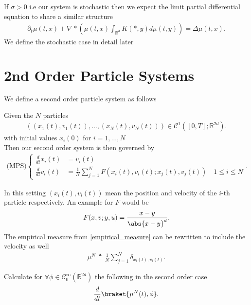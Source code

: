 \begin{corollary}
  If $\sigma  > 0$ i.e our system is stochastic then we expect the limit partial differential equation to share a similar structure
  \begin{align*}
    \partial_t \mu(t,x) + \nabla * \left( \mu(t,x) \int_{\mathbb{R}^{d} } K(*,y) d\mu(t,y) \right)  = \Delta \mu(t,x)
  .\end{align*}
  We define the stochastic case in detail later 
\end{corollary}
\section{2nd Order Particle Systems}
We define a second order particle system as follows 
\begin{definition}
 Given the $N$ particles 
 \begin{align*}
   ((x_{1}(t),v_{1}(t)),\ldots ,(x_N(t),v_N(t))) \in  \mathcal{C}^{1}([0,T];\mathbb{R}^{2d} ) 
 .\end{align*}
 with initial values  $x_i(0)$  for $i = 1,\ldots ,N$\\[1ex]
  Then our second order system is then governed by  
  \begin{align*}
    \text{(MPS)}\begin{cases}
      \frac{d}{dt} x_i(t) &= v_i(t) \\
      \frac{d}{dt} v_i(t) &= \frac{1}{N} \sum_{j=1}^{N} F(x_{i}(t),v_i(t) ; x_j(t),v_j(t) )  \quad 1\le i\le N
    \end{cases}
  .\end{align*}
\end{definition}
In this setting $(x_{i}(t),v_i(t))$ mean the position and velocity of the $i$-th particle respectively.
An example for $F$ would be 
\begin{align*}
  F(x,v;y,u) = \frac{x-y}{\abs{x-y}^{d} }
.\end{align*}
The empirical measure from \autoref{empirical_measure} can be rewritten to include the velocity as well 
\begin{align*}
  \mu^N \triangleq \frac{1}{N} \sum_{j=1}^{N} \delta_{x_i(t),v_i(t)} 
.\end{align*}
\begin{exercise}
 Calculate  for $\forall  \phi  \in  \mathcal{C}_0^{\infty}(\mathbb{R}^{2d} ) $  the following in  the second order case
 \begin{align*}
   \frac{d}{dt} \braket{\mu^N(t),\phi }
 .\end{align*}
\end{exercise}
\newpage
